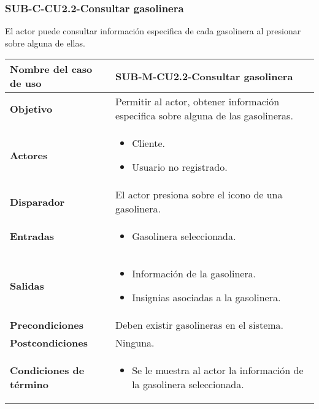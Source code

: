 \subsubsection{SUB-C-CU2.2-Consultar gasolinera}\label{SUB-C-CU2.2}
El actor puede consultar información especifica de cada gasolinera al presionar sobre alguna de ellas.

\begin{longtable}{|J{5cm}|J{10.3cm}|}
	\hline
	\textbf{Nombre del caso de uso} &
		SUB-M-CU2.2-Consultar gasolinera \\ \hline
	\textbf{Objetivo} &
		Permitir al actor, obtener información especifica sobre alguna de las gasolineras. \\ \hline
	\textbf{Actores} &
		\begin{itemize}
			\item Cliente.
			\item Usuario no registrado.
		\end{itemize}
		 \\ \hline 
	\textbf{Disparador} & 
		El actor presiona sobre el icono de una gasolinera. \\ \hline 
	\textbf{Entradas} & 
		\begin{itemize}
				\item Gasolinera seleccionada.
		\end{itemize}\\ \hline 
	\textbf{Salidas} & 
		\begin{itemize}
			\item Información de la gasolinera.
			\item Insignias asociadas a la gasolinera.
		\end{itemize} \\ \hline
	\textbf{Precondiciones} &
		Deben existir gasolineras en el sistema.\\ \hline
	\textbf{Postcondiciones} & Ninguna.
		\\ \hline
	\textbf{Condiciones de término} & 
		\begin{itemize}
			\item Se le muestra al actor la información de la gasolinera seleccionada.
		\end{itemize} \\ \hline 

\end{longtable}
